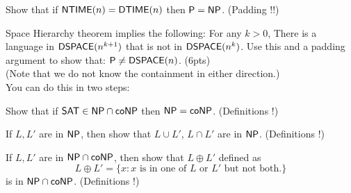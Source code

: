 \documentclass[addpoints,12pt]{exam}
\begin{document}
\begin{questions}

\question[5] 
Show that if ${\mathsf{NTIME}}(n) = {\mathsf{DTIME}}(n)$ then ${\mathsf{P}} = {\mathsf{NP}}$. (Padding !!)

\question[10]
 Space Hierarchy theorem implies the following: For any $k >
0$, There is a language in ${\mathsf{DSPACE}}(n^{k+1})$ that is not in
${\mathsf{DSPACE}}(n^k)$. Use this and a padding argument to show that: ${\mathsf{P}}
\neq {\ensuremath{\mathsf{DSPACE}}}(n)$. (6pts) \\ (Note that we do not know the containment
in either direction.) \\ You can do this in two steps:

\question[5]
Show that if ${\mathsf{SAT}} \in {\ensuremath{\mathsf{NP}}} \cap {\ensuremath{\mathsf{co}}}{\ensuremath{\mathsf{NP}}}$ then ${\mathsf{NP}} = {\mathsf{co}}{\mathsf{NP}}$. (Definitions !)

\question[5]
If $L, L'$ are in ${\mathsf{NP}}$, then show that $L \cup L'$, $L \cap L'$ are in ${\mathsf{NP}}$. (Definitions !)
  
\question[5]
If $L, L'$ are in ${\mathsf{NP}} \cap {\ensuremath{\mathsf{co}}}{\ensuremath{\mathsf{NP}}}$, then show that $L \oplus  L'$ defined as 
\[ L \oplus L' = \{ x : x \textrm{ is in one of $L$ or $L'$ but not both.} \} \]
is in ${\mathsf{NP}} \cap {\ensuremath{\mathsf{co}}}{\ensuremath{\mathsf{NP}}}$. (Definitions !)


\end{questions}
\end{document}
